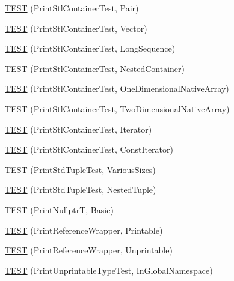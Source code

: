 \begin{DoxyCompactItemize}
\mbox{\hyperlink{namespacetesting_1_1gtest__printers__test_ad5d3e873b00c1c9e3f5924e106dd7831}{T\+E\+ST}} (Print\+Stl\+Container\+Test, Pair)
\item 
\mbox{\hyperlink{namespacetesting_1_1gtest__printers__test_abfab1ea62f0285c0cdbcca500be0dac8}{T\+E\+ST}} (Print\+Stl\+Container\+Test, Vector)
\item 
\mbox{\hyperlink{namespacetesting_1_1gtest__printers__test_a55eca253f3365ad26183bcc711cb257a}{T\+E\+ST}} (Print\+Stl\+Container\+Test, Long\+Sequence)
\item 
\mbox{\hyperlink{namespacetesting_1_1gtest__printers__test_ad8fb463805baecdfb95154dec6ec4f27}{T\+E\+ST}} (Print\+Stl\+Container\+Test, Nested\+Container)
\item 
\mbox{\hyperlink{namespacetesting_1_1gtest__printers__test_a6dd59bbdea483f662fe62e2c55c106ce}{T\+E\+ST}} (Print\+Stl\+Container\+Test, One\+Dimensional\+Native\+Array)
\item 
\mbox{\hyperlink{namespacetesting_1_1gtest__printers__test_aca371c218e2248562ed258eaf385f4d1}{T\+E\+ST}} (Print\+Stl\+Container\+Test, Two\+Dimensional\+Native\+Array)
\item 
\mbox{\hyperlink{namespacetesting_1_1gtest__printers__test_a01ec32faf0032f9fbcf4895d8d6e4aa9}{T\+E\+ST}} (Print\+Stl\+Container\+Test, Iterator)
\item 
\mbox{\hyperlink{namespacetesting_1_1gtest__printers__test_a3b54f9a039804190b7ff2e818169c0f2}{T\+E\+ST}} (Print\+Stl\+Container\+Test, Const\+Iterator)
\item 
\mbox{\hyperlink{namespacetesting_1_1gtest__printers__test_a4546860bd002446294bfb5b854be8cbb}{T\+E\+ST}} (Print\+Std\+Tuple\+Test, Various\+Sizes)
\item 
\mbox{\hyperlink{namespacetesting_1_1gtest__printers__test_a323c7a67d4e8247285991b37ee6bef4e}{T\+E\+ST}} (Print\+Std\+Tuple\+Test, Nested\+Tuple)
\item 
\mbox{\hyperlink{namespacetesting_1_1gtest__printers__test_ad4fb0ad917ed8dfb5f6a966a9ad05847}{T\+E\+ST}} (Print\+NullptrT, Basic)
\item 
\mbox{\hyperlink{namespacetesting_1_1gtest__printers__test_a5de1467a5a6c9f996345b7f2dec1467d}{T\+E\+ST}} (Print\+Reference\+Wrapper, Printable)
\item 
\mbox{\hyperlink{namespacetesting_1_1gtest__printers__test_a0f935a13826edbe21933d5698c1dbf2e}{T\+E\+ST}} (Print\+Reference\+Wrapper, Unprintable)
\item 
\mbox{\hyperlink{namespacetesting_1_1gtest__printers__test_a805264fd24de8e65cba977a798abc54c}{T\+E\+ST}} (Print\+Unprintable\+Type\+Test, In\+Global\+Namespace)

\end{DoxyCompactItemize}
